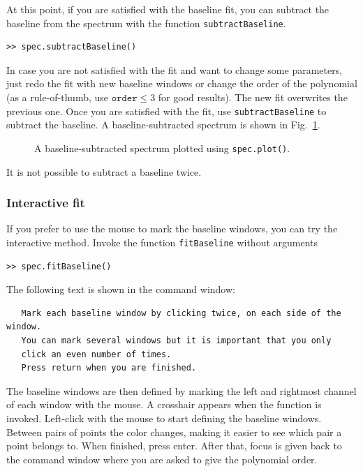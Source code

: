 \documentclass[11pt,a4paper]{article}
\begin{document}
At this point, if you are satisfied with the baseline fit, you can
subtract the baseline from the spectrum with the function
\texttt{subtractBaseline}.
\begin{lstlisting}
>> spec.subtractBaseline()
\end{lstlisting}
In case you are not satisfied with the fit and want to change some
parameters, just redo the fit with new baseline windows or change the
order of the polynomial (as a rule-of-thumb, use $\mathtt{order}\leq3$
for good results). The new fit overwrites the previous one. Once you
are satisfied with the fit, use \texttt{subtractBaseline} to subtract
the baseline. A baseline-subtracted spectrum is shown in
Fig.~\ref{fig:baseline-subtracted}.
\begin{figure}[h!]
  \centering
  \caption{A baseline-subtracted spectrum plotted using
    \texttt{spec.plot()}.}
\label{fig:baseline-subtracted}
\end{figure}

It is not possible to subtract a baseline twice. 

\subsubsection{Interactive fit}
\label{sec:interactive-fit}

If you prefer to use the mouse to mark the baseline windows, you can
try the interactive method. Invoke the function
\texttt{fitBaseline} without arguments

\begin{lstlisting}
>> spec.fitBaseline()
\end{lstlisting}
\noindent
The following text is shown in the command window:

\begin{lstlisting}
   Mark each baseline window by clicking twice, on each side of the window.
   You can mark several windows but it is important that you only
   click an even number of times.
   Press return when you are finished.
\end{lstlisting}
\noindent
The baseline windows are then defined by marking the left and
rightmost channel of each window with the mouse. A crosshair appears
when the function is invoked. Left-click with the mouse to start
defining the baseline windows. Between pairs of points the color
changes, making it easier to see which pair a point belongs to. When
finished, press enter. After that, focus is given back to the command
window where you are asked to give the polynomial order. 
\end{document}
